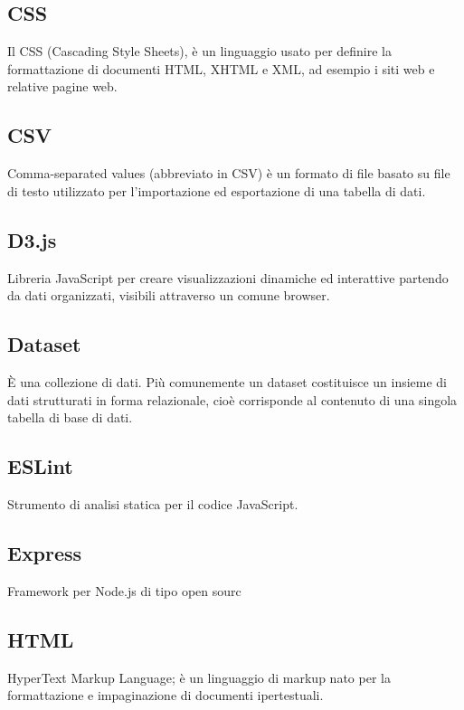 \documentclass[../manuale_sviluppatore.tex]{subfiles}
\begin{document}
\subsection*{CSS}
{}
Il CSS (Cascading Style Sheets), è un linguaggio usato per definire la formattazione di documenti HTML, XHTML e XML, ad esempio i siti web e relative pagine web.

\subsection*{CSV}
{}
Comma-separated values (abbreviato in CSV) è un formato di file basato su file di testo utilizzato per l'importazione ed esportazione di una tabella di dati.

\subsection*{D3.js}
{}
Libreria JavaScript per creare visualizzazioni dinamiche ed interattive partendo da dati organizzati, visibili attraverso un comune browser.

\subsection*{Dataset}
{}
È una collezione di dati. Più comunemente un dataset costituisce un insieme di dati strutturati in forma relazionale, cioè corrisponde al contenuto di una singola tabella di base di dati.

\subsection*{ESLint}
{}
Strumento di analisi statica per il codice JavaScript.

\subsection*{Express}
{}
Framework per Node.js di tipo open sourc

\subsection*{HTML}
{}
HyperText Markup Language; è un linguaggio di markup nato per la formattazione e impaginazione di documenti ipertestuali.
\end{document}

